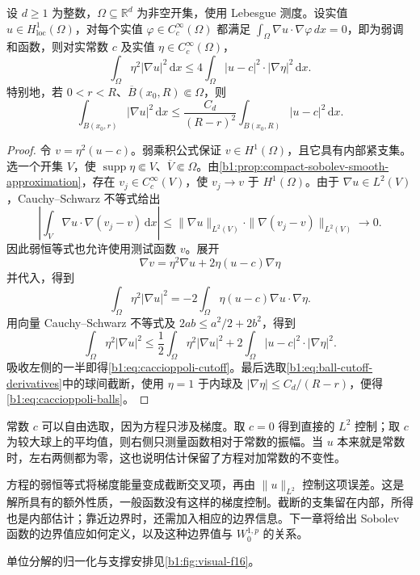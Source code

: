 \begin{theorem}[Caccioppoli]\label{b1:thm:caccioppoli}
设 \(d\geq1\) 为整数，\(\Omega\subseteq\mathbb R^d\) 为非空开集，使用 Lebesgue 测度。设实值 \(u\in H^1_{\mathrm{loc}}(\Omega)\)，对每个实值 \(\varphi\in C_c^\infty(\Omega)\) 都满足 \(\int_\Omega\nabla u\cdot\nabla\varphi\,dx=0\)，即为弱调和函数，则对实常数 \(c\) 及实值 \(\eta\in C_c^\infty(\Omega)\)，
\begin{equation}\label{b1:eq:caccioppoli-cutoff}
 \int_\Omega\eta^2|\nabla u|^2\,\mathrm dx
 \le4\int_\Omega|u-c|^2\cdot|\nabla\eta|^2\,\mathrm dx.
\end{equation}
特别地，若 \(0<r<R\)、\(\overline B(x_0,R)\Subset\Omega\)，则
\begin{equation}\label{b1:eq:caccioppoli-balls}
 \int_{B(x_0,r)}|\nabla u|^2\,\mathrm dx
 \le\frac{C_d}{(R-r)^2}
       \int_{B(x_0,R)}|u-c|^2\,\mathrm dx.
\end{equation}
\end{theorem}
\begin{proof}
令 \(v=\eta^2(u-c)\)。弱乘积公式保证 \(v\in H^1(\Omega)\)，且它具有内部紧支集。选一个开集 \(V\)，使 \(\operatorname{supp}\eta\Subset V\)、\(\overline V\Subset\Omega\)。由\cref{b1:prop:compact-sobolev-smooth-approximation}，存在 \(v_j\in C_c^\infty(V)\)，使 \(v_j\to v\) 于 \(H^1(\Omega)\)。由于 \(\nabla u\in L^2(V)\)，Cauchy--Schwarz 不等式给出
\[
 \left|\int_V\nabla u\cdot\nabla(v_j-v)\,\mathrm dx\right|
 \le\|\nabla u\|_{L^2(V)}
      \cdot\|\nabla(v_j-v)\|_{L^2(V)}
 \longrightarrow0.
\]
因此弱恒等式也允许使用测试函数 \(v\)。展开
\[
 \nabla v=\eta^2\nabla u+2\eta(u-c)\nabla\eta
\]
并代入，得到
\[
 \int_\Omega\eta^2|\nabla u|^2
 =-2\int_\Omega\eta(u-c)\nabla u\cdot\nabla\eta.
\]
用向量 Cauchy--Schwarz 不等式及 \(2ab\le a^2/2+2b^2\)，得到
\[
 \int_\Omega\eta^2|\nabla u|^2
 \le\frac12\int_\Omega\eta^2|\nabla u|^2
       +2\int_\Omega|u-c|^2\cdot|\nabla\eta|^2.
\]
吸收左侧的一半即得\eqref{b1:eq:caccioppoli-cutoff}。最后选取\eqref{b1:eq:ball-cutoff-derivatives}中的球间截断，使用 \(\eta=1\) 于内球及 \(|\nabla\eta|\le C_d/(R-r)\)，便得\eqref{b1:eq:caccioppoli-balls}。
\end{proof}

常数 \(c\) 可以自由选取，因为方程只涉及梯度。取 \(c=0\) 得到直接的 \(L^2\) 控制；取 \(c\) 为较大球上的平均值，则右侧只测量函数相对于常数的振幅。当 \(u\) 本来就是常数时，左右两侧都为零，这也说明估计保留了方程对加常数的不变性。

\ProseParagraphBreak

方程的弱恒等式将梯度能量变成截断交叉项，再由 \(\|u\|_{L^2}\) 控制这项误差。这是解所具有的额外性质，一般函数没有这样的梯度控制。截断的支集留在内部，所得也是内部估计；靠近边界时，还需加入相应的边界信息。下一章将给出 Sobolev 函数的边界值应如何定义，以及这种边界值与 \(W_0^{1,p}\) 的关系。

单位分解的归一化与支撑安排见\cref{b1:fig:visual-f16}。

